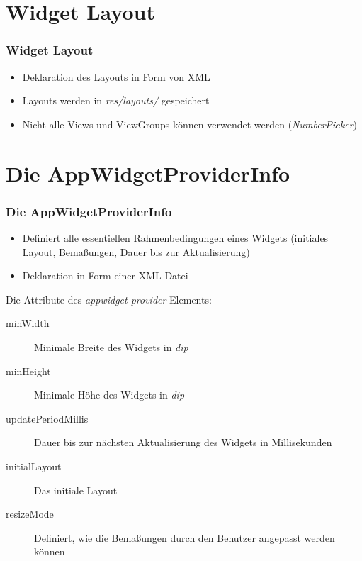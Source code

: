 \section{Widget Layout}
\begin{frame}[label=widget_layout]
   \frametitle{Widget Layout}
   \begin{itemize}
      \item Deklaration des Layouts in Form von XML
      \item Layouts werden in \emph{res/layouts/} gespeichert
      \item Nicht alle Views und ViewGroups können verwendet werden (\emph{NumberPicker})
   \end{itemize}

   
\end{frame}

\section{Die AppWidgetProviderInfo}
\begin{frame}[label=widget_provider_info]
   \frametitle{Die AppWidgetProviderInfo}
   \begin{itemize}
      \item Definiert alle essentiellen Rahmenbedingungen eines Widgets
         (initiales Layout, Bemaßungen, Dauer bis zur Aktualisierung)
      \item Deklaration in Form einer XML-Datei
   \end{itemize}

   
   	
   Die Attribute des \emph{appwidget-provider} Elements:
   
   \begin{description}
      \item[minWidth] Minimale Breite des Widgets in \emph{dip}
      \item[minHeight] Minimale Höhe des Widgets in \emph{dip}
      \item[updatePeriodMillis] Dauer bis zur nächsten Aktualisierung 
         des Widgets in Millisekunden
      \item[initialLayout] Das initiale Layout
      \item[resizeMode] Definiert, wie die Bemaßungen durch den Benutzer 
         angepasst werden können
   \end{description}
\end{frame}

